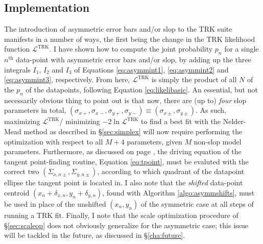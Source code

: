 \subsection{Implementation}
The introduction of asymmetric error bars and/or slop to the TRK suite manifests in a number of ways, the first being the change in the TRK likelihood function $\mathcal{L}^\text{TRK}$.
I have shown how to compute the joint probability $p_n$ for a single $n^\text{th}$ data-point with asymmetric error bars and/or slop, by adding up the three integrals $I_1$, $I_2$ and $I_3$ of Equations \eqref{eq:asymmint1}, \eqref{eq:asymmint2} and \eqref{eq:asymmint3}, respectively. From here, $\mathcal{L}^\text{TRK}$ is simply the product of all $N$ of the $p_n$ of the datapoints, following Equation \eqref{eq:likelibasic}. An essential, but not necessarily obvious thing to point out is that now, there are (up to) \textit{four} slop parameters in total, $(\sigma_{x+}, \sigma_{x-}, \sigma_{y+}, \sigma_{y-})\equiv(\sigma_{x\pm}, \sigma_{y\pm})$. As such, maximizing $\mathcal{L}^\text{TRK}$/ minimizing $-2\ln\mathcal{L}^\text{TRK}$ to find a best fit with the Nelder-Mead method as described in \S\ref{sec:simplex} will now require performing the optimization with respect to all $M+4$ parameters, given $M$ non-slop model parameters. Furthermore, as discussed on page \pageref{pg:tpointasymm}, the driving equation of the tangent point-finding routine, Equation \eqref{eq:tpoint}, must be evaluted with the correct two $(\Sigma_{x,n\pm},\Sigma_{y,n\pm})$, according to which quadrant of the datapoint ellipse the tangent point is located in. I also note that the \textit{shifted} data-point centroid $(x_n+\delta_{x,n}, y_n+\delta_{y,n})$, found with Algorithm \ref{algo:asymmshifts}, must be used in place of the unshifted $(x_n,y_n)$ of the symmetric case at all steps of running a TRK fit. Finally, I note that the scale optimization procedure of \S\ref{sec:scaleop} does not obviously generalize for the asymmetric case; this issue will be tackled in the future, as discussed in \S\ref{cha:future}.